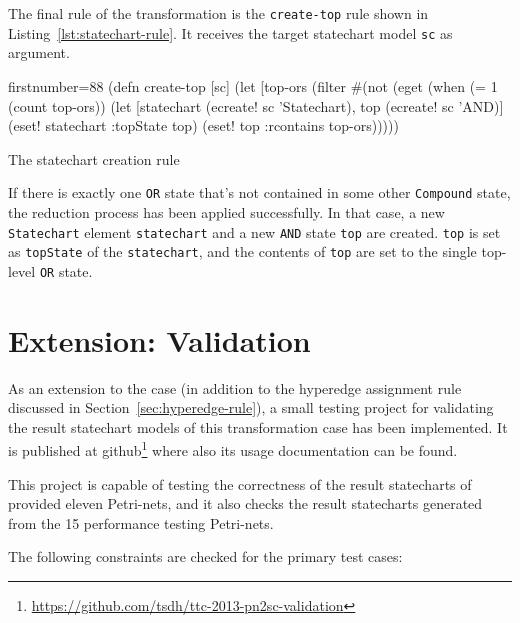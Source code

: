 \documentclass[11pt]{article}
\begin{document}
The final rule of the transformation is the \verb|create-top| rule shown in
Listing~\ref{lst:statechart-rule}.  It receives the target statechart model
\verb|sc| as argument.

\begin{listing}[H]
  \begin{clojurecode*}{firstnumber=88}
(defn create-top [sc]
  (let [top-ors (filter #(not (eget %
    (when (= 1 (count top-ors))
      (let [statechart (ecreate! sc 'Statechart), top (ecreate! sc 'AND)]
        (eset! statechart :topState top)
        (eset! top :rcontains top-ors)))))
  \end{clojurecode*}
  \label{lst:statechart-rule}
  \caption{The statechart creation rule}
\end{listing}

If there is exactly one \verb|OR| state that's not contained in some other
\verb|Compound| state, the reduction process has been applied successfully.  In
that case, a new \verb|Statechart| element \verb|statechart| and a new
\verb|AND| state \verb|top| are created.  \verb|top| is set as \verb|topState|
of the \verb|statechart|, and the contents of \verb|top| are set to the single
top-level \verb|OR| state.


\section{Extension: Validation}
\label{sec:validation}

As an extension to the case (in addition to the hyperedge assignment rule
discussed in Section~\ref{sec:hyperedge-rule}), a small testing project for
validating the result statechart models of this transformation case has been
implemented.  It is published at
github\footnote{\url{https://github.com/tsdh/ttc-2013-pn2sc-validation}} where
also its usage documentation can be found.

This project is capable of testing the correctness of the result statecharts of
provided eleven Petri-nets, and it also checks the result statecharts generated
from the 15 performance testing Petri-nets.

The following constraints are checked for the primary test cases:
\end{document}
